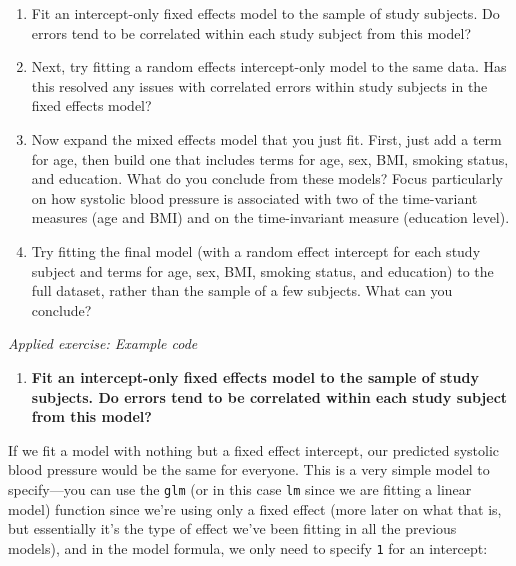 \documentclass[
]{book}
\newenvironment{Shaded}{\begin{snugshade}}{\end{snugshade}}
\newcommand{\DataTypeTok}[1]{\textcolor[rgb]{0.13,0.29,0.53}{#1}}
\newcommand{\DecValTok}[1]{\textcolor[rgb]{0.00,0.00,0.81}{#1}}
\newcommand{\KeywordTok}[1]{\textcolor[rgb]{0.13,0.29,0.53}{\textbf{#1}}}
\newcommand{\NormalTok}[1]{#1}
\newcommand{\OperatorTok}[1]{\textcolor[rgb]{0.81,0.36,0.00}{\textbf{#1}}}
\newcommand{\StringTok}[1]{\textcolor[rgb]{0.31,0.60,0.02}{#1}}
\providecommand{\tightlist}{%
  \setlength{\itemsep}{0pt}\setlength{\parskip}{0pt}}
\begin{document}
\begin{enumerate}
\def\labelenumi{\arabic{enumi}.}
\tightlist
\item
  Fit an intercept-only fixed effects model to the sample of study subjects. Do errors tend to be correlated within each study subject from this model?
\item
  Next, try fitting a random effects intercept-only model to the same data. Has this resolved any issues with correlated errors within study subjects in the fixed effects model?
\item
  Now expand the mixed effects model that you just fit. First, just add a term for
  age, then build one that includes terms for age, sex, BMI, smoking status, and
  education. What do you conclude from these models? Focus particularly on how
  systolic blood pressure is associated with two of the time-variant measures
  (age and BMI) and on the time-invariant measure (education level).
\item
  Try fitting the final model (with a random effect intercept for each study
  subject and terms for age, sex, BMI, smoking status, and education) to the
  full dataset, rather than the sample of a few subjects. What can you conclude?
\end{enumerate}

\emph{Applied exercise: Example code}

\begin{enumerate}
\def\labelenumi{\arabic{enumi}.}
\tightlist
\item
  \textbf{Fit an intercept-only fixed effects model to the sample of study subjects. Do errors tend to be correlated within each study subject from this model?}
\end{enumerate}

If we fit a model with nothing but a fixed effect intercept, our predicted systolic
blood pressure would be the same for everyone. This is a very simple model to
specify---you can use the \texttt{glm} (or in this case \texttt{lm} since we are fitting a linear
model) function since we're using only a fixed effect (more later on what that is,
but essentially it's the type of effect we've been fitting in all the previous models),
and in the model formula, we only need to specify \texttt{1} for an intercept:

\begin{Shaded}
\end{Shaded}
\end{document}
